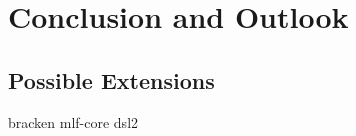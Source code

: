 
\chapter{Conclusion and Outlook} %

\label{ChapterX} %


\section{Possible Extensions}

bracken
mlf-core
dsl2
